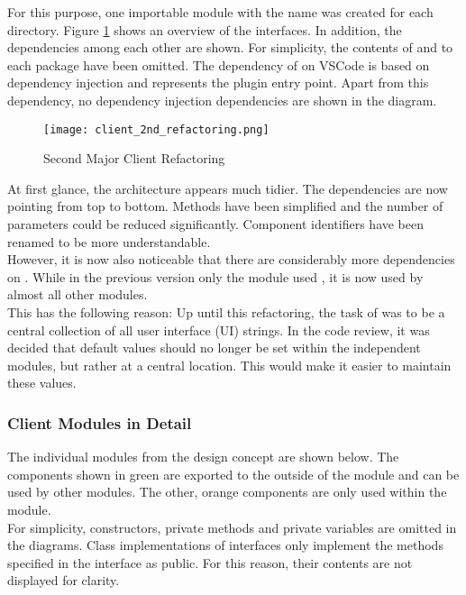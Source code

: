 For this purpose, one importable module with the name  was created for each directory.
Figure \ref{fig:client_2nd_refactoring} shows an overview of the interfaces.
In addition, the dependencies among each other are shown.
For simplicity, the contents of  and  to each package have been omitted.
The dependency of  on VSCode is based on dependency injection and represents the plugin entry point.
Apart from this dependency, no dependency injection dependencies are shown in the diagram. \\

\begin{figure}[H]
    \centering
    \texttt{[image: client\_2nd\_refactoring.png]}
    \caption{Second Major Client Refactoring}
    \label{fig:client_2nd_refactoring}
\end{figure}

At first glance, the architecture appears much tidier.
The dependencies are now pointing from top to bottom.
Methods have been simplified and the number of parameters could be reduced significantly.
Component identifiers have been renamed to be more understandable. \\

However, it is now also noticeable that there are considerably more dependencies on .
While in the previous version only the module  used , it is now used by almost all other modules.\\

This has the following reason: Up until this refactoring, the task of  was to be a central collection of all user interface (UI) strings. 
In the code review, it was decided that default values should no longer be set within the independent modules,
but rather at a central location.
This would make it easier to maintain these values.

\subsubsection{Client Modules in Detail}
The individual modules from the design concept are shown below.
The components shown in green are exported to the outside of the module and can be used by other modules.
The other, orange components are only used within the module. \\

For simplicity, constructors, private methods and private variables are omitted in the diagrams.
Class implementations of interfaces only implement the methods specified in the interface as public.
For this reason, their contents are not displayed for clarity. \\

